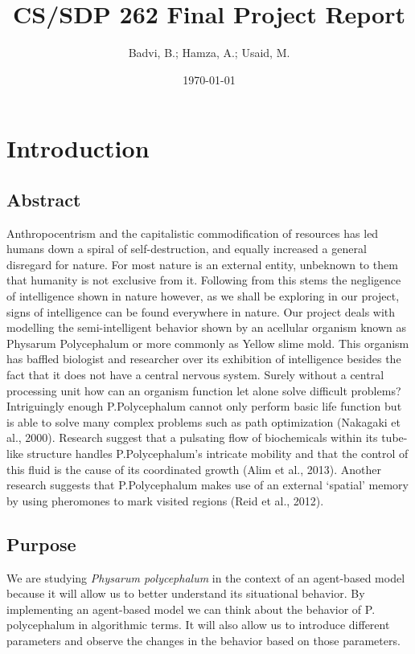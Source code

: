 \documentclass[a4paper, 11pt]{article}
\title{CS/SDP 262 Final Project Report}
\date{\today}
\author{Badvi, B.; Hamza, A.; Usaid, M.}
\begin{document}
\maketitle
\newpage
\tableofcontents
\newpage
\section {Introduction}
\subsection{Abstract}
Anthropocentrism and the capitalistic commodification of resources has led humans down a spiral of self-destruction, and equally increased a general disregard for nature. For most nature is an external entity, unbeknown to them that humanity is not exclusive from it. Following from this stems the negligence of intelligence shown in nature however, as we shall be exploring in our project, signs of intelligence can be found everywhere in nature. Our project deals with modelling the semi-intelligent behavior shown by an acellular organism known as Physarum Polycephalum or more commonly as Yellow slime mold. This organism has baffled biologist and researcher over its exhibition of intelligence besides the fact that it does not have a central nervous system. Surely without a central processing unit how can an organism function let alone solve difficult problems? Intriguingly enough P.Polycephalum cannot only perform basic life function but is able to solve many complex problems such as path optimization (Nakagaki et al., 2000). Research suggest that a pulsating flow of biochemicals within its tube-like structure handles P.Polycephalum’s intricate mobility and that the control of this fluid is the cause of its coordinated growth (Alim et al., 2013). Another research suggests that P.Polycephalum makes use of an external ‘spatial’ memory by using pheromones to mark visited regions (Reid et al., 2012).

\subsection{Purpose}
We are studying \textit{Physarum polycephalum} in the context of an agent-based model because it will allow us to better understand its situational behavior. By implementing an agent-based model we can think about the behavior of P. polycephalum in algorithmic terms. It will also allow us to introduce different parameters and observe the changes in the behavior based on those parameters. 
\end{document}
